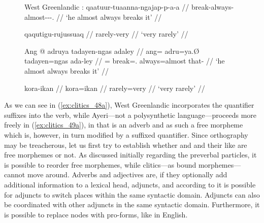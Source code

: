 \begin{figure}[h]
\pex\label{ex:clitics_48}
West Greenlandic \citep[60, 63]{bittner1995}:
\a\label{ex:clitics_48a}\begingl
	\gla qaatuur-tuaanna-ngajap-p-a-a //
	\glb break-always-almost-\Ind{}-\Tr{}-\Tsg{}.\Tsg{} //
	\glft `he almost always breaks it' //
\endgl

\a\label{ex:clitics_48b}\begingl
	\gla qaqutigu-rujussuaq //
	\glb rarely-very //
	\glft `very rarely' //
\endgl
\xe
\end{figure}

\begin{figure}
\pex\label{ex:clitics_49}
\a\label{ex:clitics_49a}\begingl
	\gla Ang @ adruya tadayen-ngas adaley //
	\glb ang= adru=ya.Ø tadayen=ngas ada-ley //
	\glc \AgtT{}= break=\TsgM{}.\Top{} always=almost that-\PargI{} //
	\glft `he almost always breaks it' //
\endgl

\a\label{ex:clitics_49b}\begingl
	\gla kora-ikan //
	\glb kora=ikan //
	\glc rarely=very //
	\glft `very rarely' //
\endgl
\xe
\end{figure}

As we can see in (\ref{ex:clitics_48a}), West Greenlandic incorporates the
quantifier suffixes into the verb, while Ayeri---not a polysynthetic
language---proceeds more freely in (\ref{ex:clitics_49a}), in that
 is an adverb and as such a free
morpheme which is, however, in turn modified by a suffixed quantifier. Since
orthography may be treacherous, let us first try to establish whether
 and  and their
like are free morphemes or not. As discussed initially regarding the preverbal
particles, it is possible to reorder free morphemes, while clitics---as bound
morphemes---cannot move around. Adverbs and adjectives are, if they optionally
add additional information to a lexical head, adjuncts, and according to
\citet{carnie2013} it is possible for adjuncts to switch places within the same
syntactic domain. Adjuncts can also be coordinated with other adjuncts in the
same syntactic domain. Furthermore, it is possible to replace  nodes
with pro-forms, like  in English.

